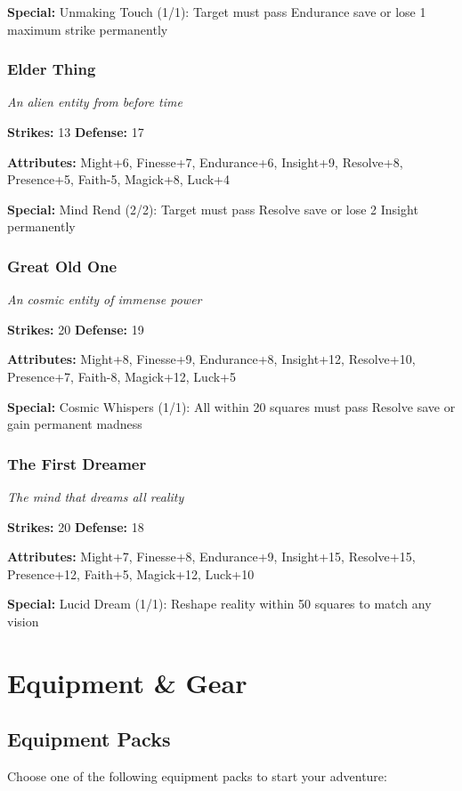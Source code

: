\documentclass[10pt,twoside]{article}
\begin{document}
\textbf{Special:} Unmaking Touch (1/1): Target must pass Endurance save or lose 1 maximum strike permanently

\subsubsection{Elder Thing}
\textit{An alien entity from before time}

\textbf{Strikes:} 13 \quad \textbf{Defense:} 17

\textbf{Attributes:} Might+6, Finesse+7, Endurance+6, Insight+9, Resolve+8, Presence+5, Faith-5, Magick+8, Luck+4

\textbf{Special:} Mind Rend (2/2): Target must pass Resolve save or lose 2 Insight permanently

\subsubsection{Great Old One}
\textit{An cosmic entity of immense power}

\textbf{Strikes:} 20 \quad \textbf{Defense:} 19

\textbf{Attributes:} Might+8, Finesse+9, Endurance+8, Insight+12, Resolve+10, Presence+7, Faith-8, Magick+12, Luck+5

\textbf{Special:} Cosmic Whispers (1/1): All within 20 squares must pass Resolve save or gain permanent madness

\subsubsection{The First Dreamer}
\textit{The mind that dreams all reality}

\textbf{Strikes:} 20 \quad \textbf{Defense:} 18

\textbf{Attributes:} Might+7, Finesse+8, Endurance+9, Insight+15, Resolve+15, Presence+12, Faith+5, Magick+12, Luck+10

\textbf{Special:} Lucid Dream (1/1): Reshape reality within 50 squares to match any vision

\clearpage

\section{Equipment \& Gear}

\subsection{Equipment Packs}
Choose one of the following equipment packs to start your adventure:
\end{document}
